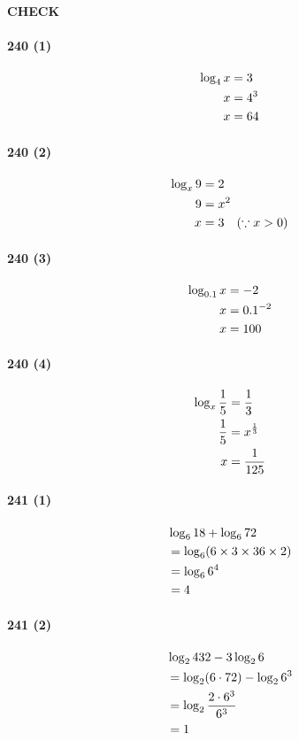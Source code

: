 \documentclass[fleqn,a4j,dvipdfmx,uplatex,twocolumn]{jsarticle}
\def\nr{\notag\\}%
\begin{document}
\clearpage
\begin{center}
  \textbf{CHECK}\\
\end{center}

\paragraph{240 (1)}
\begin{align*}
  \log_{4}x &= 3 \nr
  x &= 4^3 \nr
  x &= 64
\end{align*}

\paragraph{240 (2)}
\begin{align*}
  \log_{x}9 &= 2 \nr
  9 &= x^2 \nr
  x &= 3 \quad (\because x>0)
\end{align*}

\paragraph{240 (3)}
\begin{align*}
  \log_{0.1}x &= -2 \nr
  x &= 0.1^{-2} \nr
  x &= 100
\end{align*}

\paragraph{240 (4)}
\begin{align*}
  \log_{x}\frac{1}{5} &= \frac{1}{3} \nr
  \frac{1}{5} &= x^{\frac{1}{3}} \nr
  x &= \frac{1}{125}
\end{align*}

\paragraph{241 (1)}
\begin{align*}
  &\log_{6}18+\log_{6}72 \nr
  &= \log_{6}(6 \times 3 \times 36 \times 2) \nr
  &= \log_{6}6^4 \nr
  &= 4
\end{align*}

\paragraph{241 (2)}
\begin{align*}
  &\log_{2}432-3\log_{2}6 \nr
  &= \log_{2}(6 \cdot 72)-\log_{2}6^3 \nr
  &= \log_{2}\frac{2 \cdot 6^3}{6^3} \nr
  &= 1
\end{align*}
\end{document}
